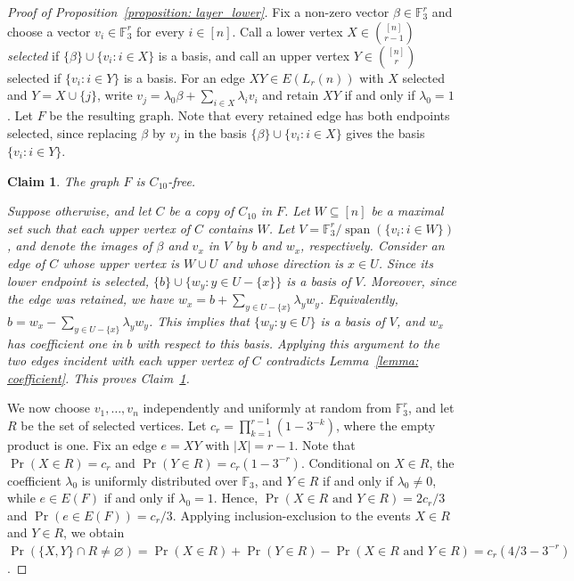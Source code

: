 \documentclass[10pt,a4paper]{amsart}
\newtheorem{claim}{Claim}
\begin{document}
\begin{proof}[Proof of Proposition~\ref{proposition: layer_lower}]

Fix a non-zero vector $\beta\in\mathbb{F}_3^r$ and choose a vector
$v_i\in\mathbb{F}_3^r$ for every $i\in[n]$.
Call a lower vertex $X \in \binom{[n]}{r-1}$ \emph{selected} if $\{\beta\} \cup \{v_i: i \in X\}$ is a basis, and call an upper vertex $Y \in \binom{[n]}r$ selected if $\{v_i: i \in Y\}$ is a basis. 
For an edge $XY \in E(L_r(n))$ with  $X$ selected and $Y = X \cup \{j\}$, write $v_j = \lambda_0 \beta + \sum_{i \in X} \lambda_i v_i$ and retain $XY$ if and only if $\lambda_0 = 1$. 
Let $F$ be the resulting graph. 
Note that every retained edge has both endpoints selected, since replacing $\beta$ by $v_j$ in the basis $\{\beta\} \cup \{v_i: i \in X\}$ gives the basis $\{v_i: i \in Y\}$.

\begin{claim}\label{claim: coefficient_free} The graph $F$ is $C_{10}$-free.

Suppose otherwise, and let $C$ be a copy of $C_{10}$ in $F$. 
Let $W \subseteq [n]$ be a maximal set such that each upper vertex of $C$ contains $W$.
Let $V = \mathbb{F}_3^r/\operatorname{span}(\{v_i: i \in W\})$, and denote the images of $\beta$ and $v_x$ in $V$ by $b$ and $w_x$, respectively. 
Consider an edge of $C$ whose upper vertex is $W \cup U$ and whose direction is $x \in U$. 
Since its lower endpoint is selected, $\{b\}\cup\{w_y: y \in U - \{x\}\}$ is a basis of $V$. 
Moreover, since the edge was retained, we have $w_x = b + \sum_{y \in U-\{x\}} \lambda_y w_y$. 
Equivalently, $b = w_x - \sum_{y \in U-\{x\}} \lambda_y w_y$. 
This implies that $\{w_y: y \in U\}$ is a basis of $V$, and $w_x$ has coefficient one in $b$ with respect to this basis. 
Applying this argument to the two edges incident with each upper vertex of $C$ contradicts Lemma~\ref{lemma: coefficient}. 
This proves Claim~\ref{claim: coefficient_free}.

\end{claim}

We now choose $v_1, \ldots, v_n$ independently and uniformly at random from $\mathbb{F}_3^r$, and let $R$ be the set of selected vertices. 
Let $c_r = \prod_{k=1}^{r-1}(1 - 3^{-k})$, where the empty product is one. 
Fix an edge $e = XY$ with $|X| = r - 1$. 
Note that $\operatorname{Pr}(X \in R) = c_r$ and $\operatorname{Pr}(Y \in R) = c_r(1 - 3^{-r})$. 
Conditional on $X \in R$, the coefficient $\lambda_0$ is uniformly distributed over $\mathbb{F}_3$, and $Y \in R$ if and only if $\lambda_0 \neq 0$, while $e \in E(F)$ if and only if $\lambda_0 = 1$. 
Hence, $\operatorname{Pr}(X \in R\text{ and }Y\in R) = 2c_r/3$ and $\operatorname{Pr}(e \in E(F))=c_r/3$. 
Applying inclusion-exclusion to the events $X \in R$ and $Y \in R$, we obtain
$\operatorname{Pr}(\{X,Y\} \cap R \neq \varnothing) = \operatorname{Pr}(X \in R) + \operatorname{Pr}(Y \in R) - \operatorname{Pr}(X \in R\text{ and }Y \in R) = c_r(4/3 - 3^{-r})$.


\end{proof}
\end{document}
